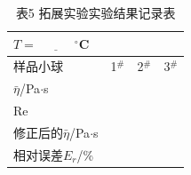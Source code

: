 \documentclass{ctexart}
\begin{document}
\begin{table}[ht]
\centering
\caption*{表5 \hspace{3em}拓展实验实验结果记录表}
\renewcommand\arraystretch{1.1}
\begin{tabular}{C{10em}|*{3}{|C{6em}}}
 \\
\hline
\hline
样品小球 & 1$^{\#}$ & 2$^{\#}$ & 3$^{\#}$  \\
\hline
$\bar{\eta}$/Pa$\cdot$s &  &  &  \\
\hline
Re &  &  &  \\
\hline
修正后的$\bar{\eta}$/Pa$\cdot$s &  &  &  \\
\hline
相对误差$E_r$/\% &  &  &  \\
\hline
\hline
\end{tabular}
\end{table}
\end{document}

